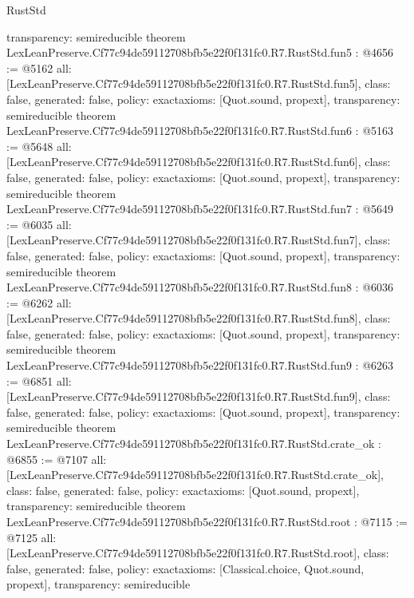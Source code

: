 \begin{lexlean}{RustStd}
\begin{coremodule}
{  transparency: semireducible
}
theorem LexLeanPreserve.Cf77c94de59112708bfb5e22f0f131fc0.R7.RustStd.fun5 : @4656 := @5162 {
  all: [LexLeanPreserve.Cf77c94de59112708bfb5e22f0f131fc0.R7.RustStd.fun5],
  class: false,
  generated: false,
  policy: exact{axioms: [Quot.sound, propext]},
  transparency: semireducible
}
theorem LexLeanPreserve.Cf77c94de59112708bfb5e22f0f131fc0.R7.RustStd.fun6 : @5163 := @5648 {
  all: [LexLeanPreserve.Cf77c94de59112708bfb5e22f0f131fc0.R7.RustStd.fun6],
  class: false,
  generated: false,
  policy: exact{axioms: [Quot.sound, propext]},
  transparency: semireducible
}
theorem LexLeanPreserve.Cf77c94de59112708bfb5e22f0f131fc0.R7.RustStd.fun7 : @5649 := @6035 {
  all: [LexLeanPreserve.Cf77c94de59112708bfb5e22f0f131fc0.R7.RustStd.fun7],
  class: false,
  generated: false,
  policy: exact{axioms: [Quot.sound, propext]},
  transparency: semireducible
}
theorem LexLeanPreserve.Cf77c94de59112708bfb5e22f0f131fc0.R7.RustStd.fun8 : @6036 := @6262 {
  all: [LexLeanPreserve.Cf77c94de59112708bfb5e22f0f131fc0.R7.RustStd.fun8],
  class: false,
  generated: false,
  policy: exact{axioms: [Quot.sound, propext]},
  transparency: semireducible
}
theorem LexLeanPreserve.Cf77c94de59112708bfb5e22f0f131fc0.R7.RustStd.fun9 : @6263 := @6851 {
  all: [LexLeanPreserve.Cf77c94de59112708bfb5e22f0f131fc0.R7.RustStd.fun9],
  class: false,
  generated: false,
  policy: exact{axioms: [Quot.sound, propext]},
  transparency: semireducible
}
theorem LexLeanPreserve.Cf77c94de59112708bfb5e22f0f131fc0.R7.RustStd.crate_ok : @6855 := @7107 {
  all: [LexLeanPreserve.Cf77c94de59112708bfb5e22f0f131fc0.R7.RustStd.crate_ok],
  class: false,
  generated: false,
  policy: exact{axioms: [Quot.sound, propext]},
  transparency: semireducible
}
theorem LexLeanPreserve.Cf77c94de59112708bfb5e22f0f131fc0.R7.RustStd.root : @7115 := @7125 {
  all: [LexLeanPreserve.Cf77c94de59112708bfb5e22f0f131fc0.R7.RustStd.root],
  class: false,
  generated: false,
  policy: exact{axioms: [Classical.choice, Quot.sound, propext]},
  transparency: semireducible
}


\end{coremodule}
\end{lexlean}
